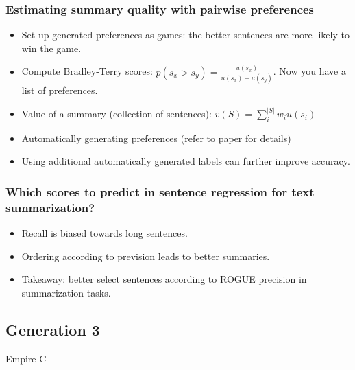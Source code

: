 \subsubsection{Estimating summary quality with pairwise preferences \cite{Zopf2018Estimating}}
\begin{itemize}
	\item Set up generated preferences as games: the better sentences are more likely to win the game.
	\item Compute Bradley-Terry scores: $p(s_x > s_y) = \frac{u(s_x)}{u(s_x) + u(s_y)}$. Now you have a list of preferences.
	\item Value of a summary (collection of sentences): $v(S) = \sum_{i}^{|S|} w_i u(s_i)$
	\item Automatically generating preferences (refer to paper for details)
	\item Using additional automatically generated labels can further improve accuracy.
\end{itemize}

\subsubsection{Which scores to predict in sentence regression for text summarization?\cite{Zopf2018Which}}
\begin{itemize}
	\item Recall is biased towards long sentences.
	\item Ordering according to prevision leads to better summaries.
	\item Takeaway: better select sentences according to ROGUE precision in summarization tasks.
\end{itemize}

\subsection{Generation 3}
Empire C
